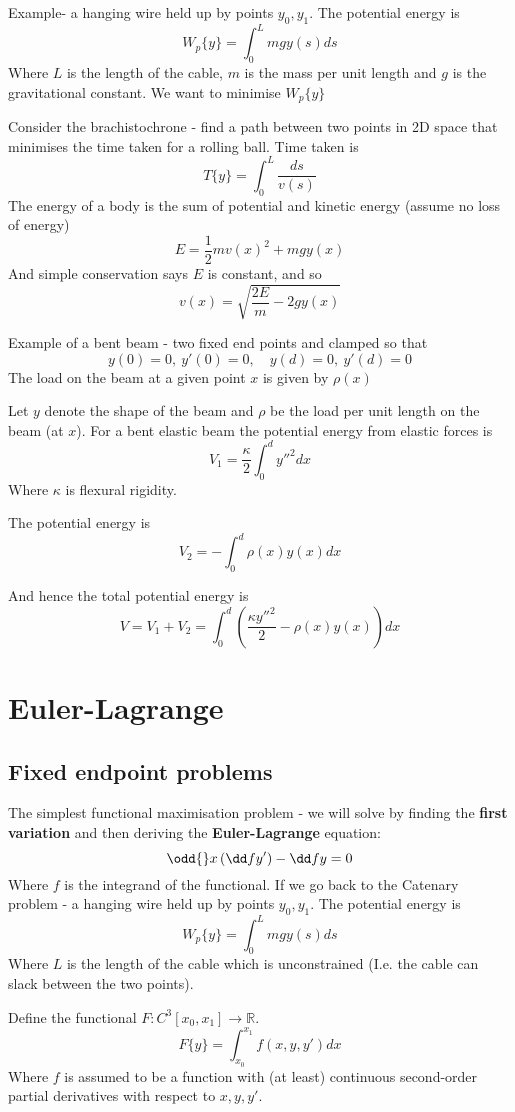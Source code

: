 \documentclass{E:/Documents/Latex/myassignment}
\begin{document}
Example- a hanging wire held up by points $y_0,y_1$. The potential energy is
\[W_p\{y\} = \int_0^L mgy(s) ds\]
Where $L$ is the length of the cable, $m$ is the mass per unit length and $g$ is the gravitational constant.
We want to minimise $W_p\{y\}$

Consider the brachistochrone - find a path between two points in 2D space that minimises the time taken for a rolling ball.
Time taken is
\[T\{y\} = \int_0^L \frac{ds}{v(s)}\]
The energy of a body is the sum of potential and kinetic energy (assume no loss of energy)
\[E = \frac12 m v(x)^2 + mg y(x)\]
And simple conservation says $E$ is constant, and so
\[v(x) = \sqrt{\frac{2E}{m} - 2gy(x)}\]

Example of a bent beam - two fixed end points and clamped so that
\[y(0) = 0,\ y'(0) = 0, \quad y(d) = 0 , \ y'(d) = 0\]
The load on the beam at a given point $x$ is given by $\rho(x)$

Let $y$ denote the shape of the beam and $\rho$ be the load per unit length on the beam (at $x$).
For a bent elastic beam the potential energy from elastic forces is
\[V_1 = \frac \kappa 2 \int_0^d y''^2 dx\]
Where $\kappa$ is flexural rigidity.

The potential energy is
\[V_2 = -\int_0^d \rho(x) y(x) dx\]

And hence the total potential energy is
\[V = V_1 + V_2 = \int_0^d \left(\frac{\kappa y''^2}2 - \rho(x)y(x)\right) dx\]


\section{Euler-Lagrange}
\subsection{Fixed endpoint problems}
The simplest functional maximisation problem - we will solve by finding the \textbf{first variation} and then deriving the \textbf{Euler-Lagrange} equation:
\[\odd{}x \left(\dd f{y'}\right) - \dd fy = 0\]
Where $f$ is the integrand of the functional.
If we go back to the Catenary problem - a hanging wire held up by points $y_0,y_1$. The potential energy is
\[W_p\{y\} = \int_0^L mgy(s) ds\]
Where $L$ is the length of the cable which is unconstrained (I.e. the cable can slack between the two points).

Define the functional $F : C^3[x_0,x_1] \to \mathbb{R}$.
\[F\{y\} = \int_{x_0}^{x_1} f(x,y,y') dx\]
Where $f$ is assumed to be a function with (at least) continuous second-order partial derivatives with respect to $x,y,y'$.
\end{document}

